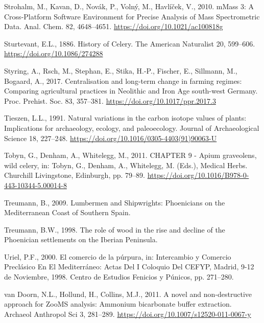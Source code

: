 \documentclass[preprint, 3p, authoryear]{elsarticle} %
\newlength{\cslhangindent}
\newlength{\cslentryspacingunit} %
\newenvironment{CSLReferences}[2] %
 {%
  \setlength{\parindent}{0pt}
  \ifodd #1
  \let\oldpar\par
  \def\par{\hangindent=\cslhangindent\oldpar}
  \fi
  \setlength{\parskip}{#2\cslentryspacingunit}
 }%
 {}
\begin{document}
\begin{CSLReferences}{1}{0}
\leavevmode{}%
Strohalm, M., Kavan, D., Novák, P., Volný, M., Havlíček, V., 2010. {mMass} 3: A {Cross}-{Platform Software Environment} for {Precise Analysis} of {Mass Spectrometric Data}. Anal. Chem. 82, 4648--4651. \url{https://doi.org/10.1021/ac100818g}

\leavevmode{}%
Sturtevant, E.L., 1886. History of {Celery}. The American Naturalist 20, 599--606. \url{https://doi.org/10.1086/274288}

\leavevmode{}%
Styring, A., Rsch, M., Stephan, E., Stika, H.-P., Fischer, E., Sillmann, M., Bogaard, A., 2017. Centralisation and long-term change in farming regimes: Comparing agricultural practices in {Neolithic} and {Iron Age} south-west {Germany}. Proc. Prehist. Soc. 83, 357--381. \url{https://doi.org/10.1017/ppr.2017.3}

\leavevmode{}%
Tieszen, L.L., 1991. Natural variations in the carbon isotope values of plants: {Implications} for archaeology, ecology, and paleoecology. Journal of Archaeological Science 18, 227--248. \url{https://doi.org/10.1016/0305-4403(91)90063-U}

\leavevmode{}%
Tobyn, G., Denham, A., Whitelegg, M., 2011. {CHAPTER} 9 - {Apium} graveolens, wild celery, in: Tobyn, G., Denham, A., Whitelegg, M. (Eds.), Medical {Herbs}. {Churchill Livingstone}, {Edinburgh}, pp. 79--89. \url{https://doi.org/10.1016/B978-0-443-10344-5.00014-8}

\leavevmode{}%
Treumann, B., 2009. Lumbermen and {Shipwrights}: {Phoenicians} on the {Mediterranean Coast} of {Southern Spain}.

\leavevmode{}%
Treumann, B.W., 1998. The role of wood in the rise and decline of the {Phoenician} settlements on the {Iberian Peninsula}.

\leavevmode{}%
Uriel, P.F., 2000. El comercio de la púrpura, in: Intercambio y Comercio Preclásico En El {Mediterráneo}: Actas Del {I} Coloquio Del {CEFYP}, {Madrid}, 9-12 de Noviembre, 1998. {Centro de Estudios Fenicios y Púnicos}, pp. 271--280.

\leavevmode{}%
van Doorn, N.L., Hollund, H., Collins, M.J., 2011. A novel and non-destructive approach for {ZooMS} analysis: Ammonium bicarbonate buffer extraction. Archaeol Anthropol Sci 3, 281--289. \url{https://doi.org/10.1007/s12520-011-0067-y}


\end{CSLReferences}
\end{document}
